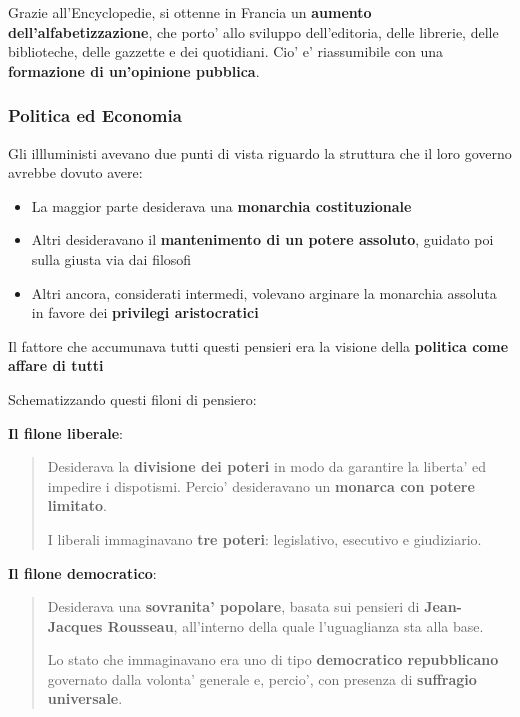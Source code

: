\documentclass{article}
\begin{document}
{{    Grazie all'Encyclopedie, si ottenne in Francia un \textbf{aumento dell'alfabetizzazione}, che porto' allo sviluppo dell'editoria, delle librerie, delle biblioteche, delle gazzette e dei quotidiani. Cio' e' riassumibile con una \textbf{formazione di un'opinione pubblica}.

    \subsubsection{Politica ed Economia} %
    Gli illluministi avevano due punti di vista riguardo la struttura che il loro governo avrebbe dovuto avere:
    
    \begin{itemize}
      \item La maggior parte desiderava una \textbf{monarchia costituzionale}
      \item Altri desideravano il \textbf{mantenimento di un potere assoluto}, guidato poi sulla giusta via dai filosofi
      \item Altri ancora, considerati intermedi, volevano arginare la monarchia assoluta in favore dei \textbf{privilegi aristocratici}
    \end{itemize}

    Il fattore che accumunava tutti questi pensieri era la visione della \textbf{politica come affare di tutti}

    Schematizzando questi filoni di pensiero:

    \textbf{Il filone liberale}:
    \begin{quote}
      Desiderava la \textbf{divisione dei poteri} in modo da garantire la liberta' ed impedire i dispotismi. Percio' desideravano un \textbf{monarca con potere limitato}.

      I liberali immaginavano \textbf{tre poteri}: legislativo, esecutivo e giudiziario.
    \end{quote}

    \textbf{Il filone democratico}:
    \begin{quote}
      Desiderava una \textbf{sovranita' popolare}, basata sui pensieri di \textbf{Jean-Jacques Rousseau}, all'interno della quale l'uguaglianza sta alla base.

      Lo stato che immaginavano era uno di tipo \textbf{democratico repubblicano} governato dalla volonta' generale e, percio', con presenza di \textbf{suffragio universale}.
    \end{quote}

}}
\end{document}
